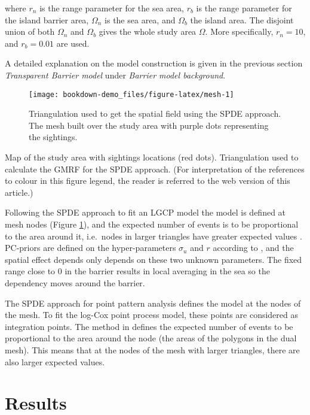 \documentclass[
]{book}
\begin{document}
where \(r_n\) is the range parameter for the sea area, \(r_b\) is the range parameter for the island barrier area, \(\Omega_n\) is the sea area, and \(\Omega_b\) the island area. The disjoint union of both \(\Omega_n\) and \(\Omega_b\) gives the whole study area \(\Omega\). More specifically, \(r_n=10\), and \(r_b=0.01\) are used.

A detailed explanation on the model construction is given in the previous section \emph{Transparent Barrier model} under \emph{Barrier model background}.

\begin{figure}
\texttt{[image: bookdown-demo\_files/figure-latex/mesh-1]} \caption{Triangulation used to get the spatial field using the SPDE approach. The mesh built over the study area with purple dots representing the sightings.}\label{fig:mesh}
\end{figure}

Map of the study area with sightings locations (red dots). Triangulation used to calculate the GMRF for the SPDE approach. (For interpretation of the references to colour in this figure legend, the reader is referred to the web version of this article.)

Following the SPDE approach to fit an LGCP model the model is defined at mesh nodes (Figure \ref{fig:mesh}), and the expected number of events is to be proportional to the area around it, i.e.~nodes in larger triangles have greater expected values \citep{krainski_advanced_2018, simpson_going_2016}. PC-priors are defined on the hyper-parameters \(\sigma_u\) and \(r\) according to \citet{fuglstad_constructing_2019}, and the spatial effect depends only depends on these two unknown parameters. The fixed range close to \(0\) in the barrier results in local averaging in the sea so the dependency moves around the barrier.

The SPDE approach for point pattern analysis defines the model at the nodes of the mesh. To fit the log-Cox point process model, these points are considered as integration points. The method in \citet{simpson_going_2016} defines the expected number of events to be proportional to the area around the node (the areas of the polygons in the dual mesh). This means that at the nodes of the mesh with larger triangles, there are also larger expected values.

\hypertarget{results}{%
\section{Results}\label{results}}
\end{document}
